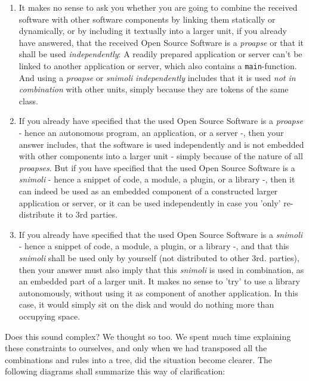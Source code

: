 \begin{enumerate}
  
  \item It makes no sense to ask you
  whether you are going to combine the received software with other software
  components by linking them statically or dynamically, or by including it
  textually into a larger unit, if you already have answered, that the received
  Open Source Software is a \emph{proapse} or that it shall be used
  \emph{independently}: A readily prepared application or server can't be linked
  to another application or server, which also contains a
  \texttt{main}-function. And using a \emph{proapse} or \emph{snimoli}
  \emph{independently} includes that it is used \emph{not in combination} with
  other units, simply because they are tokens of the same class.
  
  \item If you already have specified that the used Open Source Software is a
  \emph{proapse} - hence an autonomous program, an application, or a server -,
  then your answer includes, that the software is used independently and is not
  embedded with other components into a larger unit - simply because of the
  nature of all \emph{proapses}. But if you have specified that the used Open
  Source Software is a \emph{snimoli} - hence a snippet of code, a module, a
  plugin, or a library -, then it can indeed be used as an embedded component of
  a constructed larger application or server, or it can be used independently in
  case you 'only' re-distribute it to 3rd parties.
  
  \item If you already have specified that the used Open Source Software is a
  \emph{snimoli} - hence a snippet of code, a module, a plugin, or a library -,
  and that this \emph{snimoli} shall be used only by yourself (not distributed
  to other 3rd. parties), then your answer must also imply that this
  \emph{snimoli} is used in combination, as an embedded part of a larger unit.
  It makes no sense to 'try' to use a library autonomously, without using it
  as component of another application. In this case, it would simply sit on the
  disk and would do nothing more than occupying space.

\end{enumerate}

Does this sound complex? We thought so too. We spent much
time explaining these constraints to ourselves, and only when we had transposed
all the combinations and rules into a tree, did the situation become clearer.
The following diagrams shall summarize this way of clarification:

